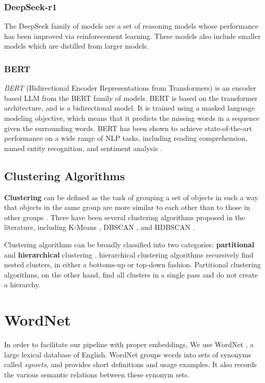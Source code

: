 \subsubsection{DeepSeek-r1}
The DeepSeek family of models \cite{deepseek-aiDeepSeekR1IncentivizingReasoning2025} are a set of reasoning models whose performance has been improved
via reinforecement learning. These models also include smaller models which are distilled from larger models.

\subsubsection{BERT}
\textit{BERT} (Bidirectional Encoder Representations from Transformers) \cite{devlinBERTPretrainingDeep2019} is an encoder based LLM from the BERT family of models. 
BERT is based on the transformer architecture, and is a bidirectional model. It is trained using a masked language modeling objective, which means that it predicts the 
missing words in a sequence given the surrounding words. BERT has been shown to achieve state-of-the-art performance on a wide range of NLP tasks, 
including reading comprehension, named entity recognition, and sentiment analysis \cite{rogersPrimerBERTologyWhat2020a}.


\subsection{Clustering Algorithms}
\textbf{Clustering} can be defined as the task of grouping a set of objects in such a way that objects in the same group are more similar to 
each other than to those in other groups \cite{jainDataClustering502010}. There have been several clustering algorithms proposed in the literature,
including K-Means \cite{lloydLeastSquaresQuantization1982}, DBSCAN \cite{esterDensitybasedAlgorithmDiscovering1996}, and HDBSCAN \cite{campelloDensityBasedClusteringBased2013}.

Clustering algorithms can be broadly classified into two categories: \textbf{partitional} and \textbf{hierarchical} clustering \cite{jainDataClustering502010}. 
hierarchical clustering algorithms recursively find nested clusters, in either a bottoms-up or top-down fashion. Partitional clustering algorithms, on the other hand,
find all clusters in a single pass and do not create a hierarchy.

\section{WordNet}
In order to facilitate our pipeline with proper embeddings, We use WordNet \cite{millerWordNetLexicalDatabase1994}, a large lexical database of English.
WordNet groups words into sets of synonyms called \textit{synsets}, and provides short definitions and usage examples. It also records the
various semantic relations between these synonym sets.

